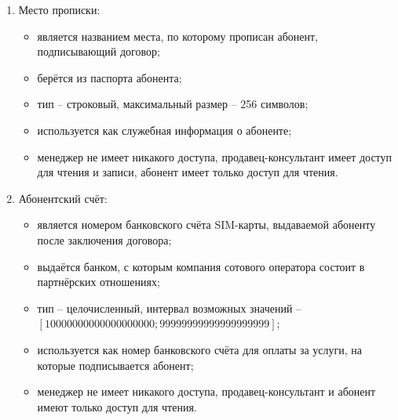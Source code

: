 \begin{enumerate}
\begin{enumerate}
        \item Место прописки:
        \begin{itemize}
            \item является названием места, по которому прописан абонент, подписывающий договор;
            \item берётся из паспорта абонента;
            \item тип -- строковый, максимальный размер -- 256 символов;
            \item используется как служебная информация о абоненте;
            \item менеджер не имеет никакого доступа, продавец-консультант имеет доступ для чтения и записи, абонент имеет только доступ для чтения.
        \end{itemize}

        \item Абонентский счёт:
        \begin{itemize}
            \item является номером банковского счёта SIM-карты, выдаваемой абоненту после заключения договора;
            \item выдаётся банком, с которым компания сотового оператора состоит в партнёрских отношениях;
            \item тип -- целочисленный, интервал возможных значений -- $[10000000000000000000; 99999999999999999999]$;
            \item используется как номер банковского счёта для оплаты за услуги, на которые подписывается абонент;
            \item менеджер не имеет никакого доступа, продавец-консультант и абонент имеют только доступ для чтения.
        \end{itemize}


\end{enumerate}
\end{enumerate}
